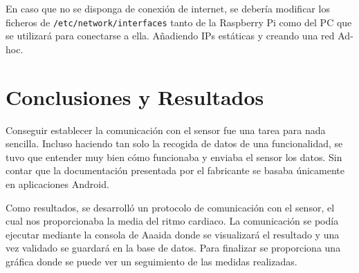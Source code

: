 En caso que no se disponga de conexión de internet, se debería modificar los ficheros de \texttt{/etc/network/interfaces} tanto de la Raspberry Pi como del PC que se utilizará para conectarse a ella. Añadiendo IPs estáticas y creando una red Ad-hoc. 


\section{Conclusiones y Resultados}

Conseguir establecer la comunicación con el sensor fue una tarea para nada sencilla. Incluso haciendo tan solo la recogida de datos de una funcionalidad, se tuvo que entender muy bien cómo funcionaba y enviaba el sensor los datos. Sin contar que la documentación presentada por el fabricante se basaba únicamente en aplicaciones Android. 

Como resultados, se desarrolló un protocolo de comunicación con el sensor, el cual nos proporcionaba la media  del ritmo cardiaco. La comunicación se podía ejecutar mediante la consola de Aaaida donde se visualizará el resultado y una vez validado se guardará en la base de datos. Para finalizar se proporciona una gráfica donde se puede ver un seguimiento de las medidas realizadas. 


